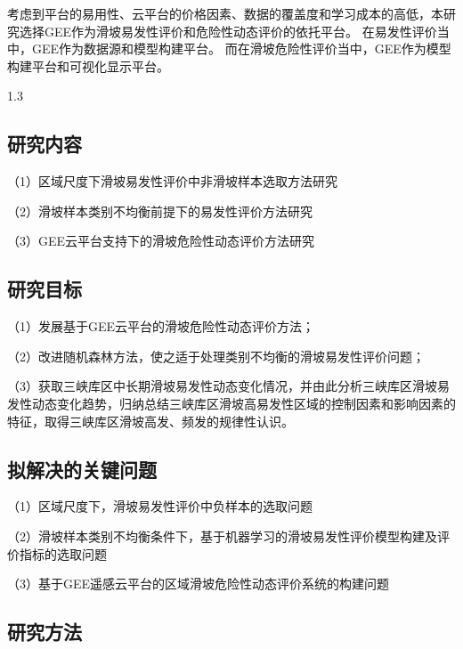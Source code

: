 \documentclass[a4paper,zihao=-4]{article}
\begin{document}
考虑到平台的易用性、云平台的价格因素、数据的覆盖度和学习成本的高低，本研究选择GEE作为滑坡易发性评价和危险性动态评价的依托平台。
在易发性评价当中，GEE作为数据源和模型构建平台。
而在滑坡危险性评价当中，GEE作为模型构建平台和可视化显示平台。


\begin{spacing}{1.3} %
	 \songti   
	
	  
	\vspace{11bp}
\end{spacing}


\subsection{研究内容}
（1）区域尺度下滑坡易发性评价中非滑坡样本选取方法研究

（2）滑坡样本类别不均衡前提下的易发性评价方法研究

（3）GEE云平台支持下的滑坡危险性动态评价方法研究

\subsection{研究目标}
（1）发展基于GEE云平台的滑坡危险性动态评价方法；

（2）改进随机森林方法，使之适于处理类别不均衡的滑坡易发性评价问题；

（3）获取三峡库区中长期滑坡易发性动态变化情况，并由此分析三峡库区滑坡易发性动态变化趋势，归纳总结三峡库区滑坡高易发性区域的控制因素和影响因素的特征，取得三峡库区滑坡高发、频发的规律性认识。

\subsection{拟解决的关键问题}
（1）区域尺度下，滑坡易发性评价中负样本的选取问题

（2）滑坡样本类别不均衡条件下，基于机器学习的滑坡易发性评价模型构建及评价指标的选取问题

（3）基于GEE遥感云平台的区域滑坡危险性动态评价系统的构建问题


\subsection{研究方法}
\end{document}
